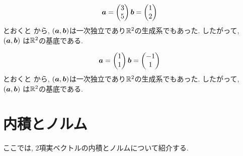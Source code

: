 \begin{example}
  \label{ex:basis:2}
  \begin{align*}
    \boldsymbol{a}=\begin{pmatrix}3\\5\end{pmatrix}
    \boldsymbol{b}=\begin{pmatrix}1\\2\end{pmatrix}
  \end{align*}
  とおくと
  から,
  $(\boldsymbol{a},\boldsymbol{b})$は一次独立であり$\mathbb{R}^2$の生成系でもあった.
  したがって,
  $(\boldsymbol{a},\boldsymbol{b})$ は$\mathbb{R}^2$の基底である.
\end{example}

\begin{example}
  \label{ex:basis:3}
  \begin{align*}
    \boldsymbol{a}=\begin{pmatrix}1\\1\end{pmatrix}
    \boldsymbol{b}=\begin{pmatrix}-1\\1\end{pmatrix}
  \end{align*}
  とおくと
  から,
  $(\boldsymbol{a},\boldsymbol{b})$は一次独立であり$\mathbb{R}^2$の生成系でもあった.
  したがって,
  $(\boldsymbol{a},\boldsymbol{b})$ は$\mathbb{R}^2$の基底である.
\end{example}





\section{内積とノルム}
ここでは, $2$項実ベクトルの内積とノルムについて紹介する.

